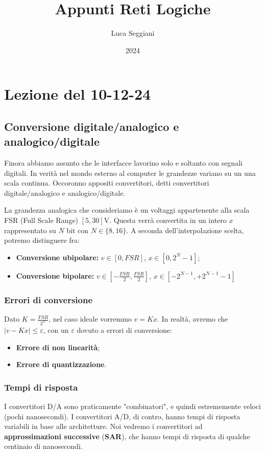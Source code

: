 \documentclass[a4paper,11pt]{article}
\title{Appunti Reti Logiche}
\author{Luca Seggiani}
\date{2024}
\begin{document}
\section{Lezione del 10-12-24}

\thispagestyle{empty}
\pagestyle{fancy}

\subsection{Conversione digitale/analogico e analogico/digitale}
Finora abbiamo assunto che le interfacce lavorino solo e soltanto con segnali digitali.
In verità nel mondo esterno al computer le grandezze variano su un una scala continua.
Occoronno appositi convertitori, detti convertitori digitale/analogico e analogico/digitale.


La grandezza analogica che consideriamo è un voltaggi appartenente alla scala FSR (Full Scale Range) $[5, 30] \mathrm{V}$.
Questa verrà convertita in un intero $x$ rappresentato su $N$ bit con $N \in \{8, 16\}$.
A seconda dell'interpolazione scelta, potremo distinguere fra:
\begin{itemize}
	\item \textbf{Conversione ubipolare:} $v \in [0, FSR]$, $x \in [0, 2^N -1]$;
	\item \textbf{Conversione bipolare:} $v \in \left[ -\frac{FSR}{2}, \frac{FSR}{2} \right]$, $x \in \left[ -2^{N-1}, +2^{N-1} -1 \right]$
\end{itemize}

\subsubsection{Errori di conversione}
Dato $K = \frac{FSR}{2^N}$, nel caso ideale vorremmo $v = Kx$.
In realtà, avremo che $|v - Kx| \leq \varepsilon$, con un $\varepsilon$ dovuto a errori di conversione:
\begin{itemize}
	\item \textbf{Errore di non linearità};
	\item \textbf{Errore di quantizzazione}.
\end{itemize}

\subsubsection{Tempi di risposta}
I convertitori D/A sono praticamente "combinatori", e quindi estrememente veloci (pochi nanosecondi).
I convertitori A/D, di contro, hanno tempi di risposta variabili in base alle architetture.
Noi vedremo i convertitori ad \textbf{approssimazioni successive} (\textbf{SAR}), che hanno tempi di risposta di qualche centinaio di nanosecondi.
\end{document}
